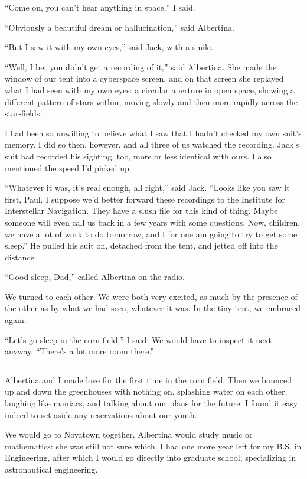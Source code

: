 \documentclass[english,11pt,letterpaper,onecolumn]{scrbook}
\begin{document}
	``Come on, you can't hear anything in space,'' I said.

	``Obviously a beautiful dream or hallucination,'' said Albertina.

	``But I saw it with my own eyes,'' said Jack, with a smile.

	``Well, I bet you didn't get a recording of it,'' said Albertina.  She made the window of our tent into a cyberspace screen, and on that screen she replayed what I had seen with my own eyes:  a circular aperture in open space, showing a different pattern of stars within, moving slowly and then more rapidly across the star-fields.

	I had been so unwilling to believe what I saw that I hadn't checked my own suit's memory.  I did so then, however, and all three of us watched the recording.  Jack's suit had recorded his sighting, too, more or less identical with ours.  I also mentioned the 
speed I'd picked up.

	``Whatever it was, it's real enough, all right,'' said Jack.  ``Looks like you saw it first, Paul.  I suppose we'd better forward these recordings to the Institute for Interstellar Navigation.  They have a slush file for this kind of thing.  Maybe someone will even call us back in a few years with some questions.  Now, children, we have a lot of work to do tomorrow, and I for one am going to try to get some sleep.''  He pulled his suit on, detached from the tent, and jetted off into the distance.

	``Good sleep, Dad,'' called Albertina on the radio.

	We turned to each other.  We were both very excited, as much by the presence of the other as by what we had seen, whatever it was.  In the tiny tent, we embraced again.

	``Let's go sleep in the corn field,'' I said.  We would have to inspect it next anyway.  ``There's a lot more room there.''

\begin{center}\rule[3pt]{2in}{0.5pt}\end{center}

	Albertina and I made love for the first time in the corn field.  Then we bounced up and down the greenhouses with nothing on, splashing water on each other, laughing like maniacs, and talking about our plans for the future.  I found it easy indeed to set aside any reservations about our youth.  

	We would go to Novatown together.  Albertina would study music or mathematics:  she was still not sure which.  I had one more year left for my B.S. in Engineering, after which I would go directly into graduate school, specializing in astronautical engineering.  
\end{document}
